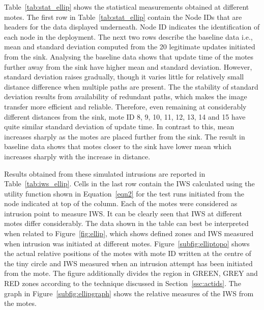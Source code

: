 \documentclass[conference,final]{IEEEtran}
\newcommand{\notedme}[1]{\raisebox{0pt}[0pt][0pt]{\pdfcomment[open=true,color=blue]{#1}}}
\begin{document}
Table~\ref{tab:stat_ellip} shows the statistical measurements obtained at different motes.
The first row in Table~\ref{tab:stat_ellip} contain the Node IDs that are headers for the data displayed underneath.
Node ID indicates the identification of each node in the deployment.
The next two rows describe the baseline data i.e., mean and standard deviation computed from the 20 legitimate updates initiated from the sink.
Analysing the baseline data shows that update time of the motes further away from the sink have higher mean and standard deviation.  
However, standard deviation raises gradually, though it varies little for relatively small distance difference when multiple paths are present.
The the stability of standard deviation results from availability of redundant paths, which makes the image transfer more efficient and reliable.
Therefore, even remaining at considerably different distances from the sink, mote ID 8, 9, 10, 11, 12, 13, 14 and 15  have quite similar standard deviation of update time.
In contrast to this, mean increases sharply as the motes are placed further from the sink.
The result in baseline data shows that motes closer to the sink have lower mean which increases sharply with the increase in distance.

Results obtained from these simulated intrusions are reported in Table~\ref{tab:iws_ellip}.
Cells in the last row contain the IWS calculated using  the utility function shown in Equation~\ref{eqn2} for the test runs initiated from the node indicated at top of the column.
Each of the motes were considered as intrusion point to measure IWS.
It can be clearly seen that IWS at different motes differ considerably.
The data shown in the table can best be interpreted when related to Figure~\ref{fig:ellip}, which shows defined zones and IWS measured when intrusion was initiated at different motes.
Figure~\ref{subfig:elliptopo} shows the actual relative positions of the motes with mote ID written at the centre of the tiny circle and IWS measured when an intrusion attempt has been initiated from the mote. 
The figure additionally divides the region in GREEN, GREY and RED zones according to the technique discussed in Section~\ref{ssc:actids}.
The graph in  Figure~\ref{subfig:ellipgraph} shows the relative measures of the IWS from the motes.
\end{document}
